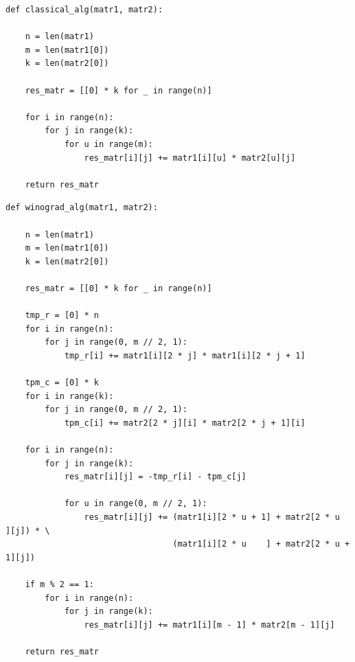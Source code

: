 \documentclass[a4paper,14pt, unknownkeysallowed]{extreport}
\begin{document}
\begin{center}
\captionsetup{justification=raggedright,singlelinecheck=off}
\begin{lstlisting}[label=lst:classical_alg,caption=Функция стандартного алгоритма умножения матриц]
def classical_alg(matr1, matr2):

    n = len(matr1)
    m = len(matr1[0])
    k = len(matr2[0])

    res_matr = [[0] * k for _ in range(n)]

    for i in range(n):
        for j in range(k):
            for u in range(m):
                res_matr[i][j] += matr1[i][u] * matr2[u][j]

    return res_matr
\end{lstlisting}
\end{center}

\clearpage

\begin{center}
\captionsetup{justification=raggedright,singlelinecheck=off}
\begin{lstlisting}[label=lst:winograd_alg,caption=Функция умножения матриц алгоритмом Винограда]
def winograd_alg(matr1, matr2):

    n = len(matr1)
    m = len(matr1[0])
    k = len(matr2[0])

    res_matr = [[0] * k for _ in range(n)]

    tmp_r = [0] * n
    for i in range(n):
        for j in range(0, m // 2, 1):
            tmp_r[i] += matr1[i][2 * j] * matr1[i][2 * j + 1]

    tpm_c = [0] * k
    for i in range(k):
        for j in range(0, m // 2, 1):
            tpm_c[i] += matr2[2 * j][i] * matr2[2 * j + 1][i]

    for i in range(n):
        for j in range(k):
            res_matr[i][j] = -tmp_r[i] - tpm_c[j]

            for u in range(0, m // 2, 1):
                res_matr[i][j] += (matr1[i][2 * u + 1] + matr2[2 * u    ][j]) * \
                                  (matr1[i][2 * u    ] + matr2[2 * u + 1][j])

    if m % 2 == 1:
        for i in range(n):
            for j in range(k):
                res_matr[i][j] += matr1[i][m - 1] * matr2[m - 1][j]

    return res_matr
\end{lstlisting}
\end{center}

\clearpage
\end{document}

